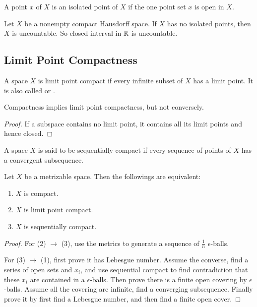 \begin{definition}
    A point $x$ of $X$ is an isolated point of $X$ if the one point set ${x}$ is open in $X$.
\end{definition}

\begin{theorem}
    Let $X$ be a nonempty compact Hausdorff space. If $X$ has no isolated points, then $X$ is uncountable.
    So closed interval in $\mathbb{R}$ is uncountable.
\end{theorem}




\subsection{Limit Point Compactness}

\begin{definition}
    A space $X$ is limit point compact if every infinite subset of $X$ has a limit point. It is also called  or .
\end{definition}

\begin{theorem}
    Compactness implies limit point compactness, but not conversely.    
\end{theorem}
\begin{proof}
    If a subspace contains no limit point, it contains all its limit points and hence closed.
\end{proof}

\begin{definition}
    A space $X$ is said to be sequentially compact if every sequence of points of $X$ has a convergent subsequence.
\end{definition}

\begin{theorem}
    Let $X$ be a metrizable space. Then the followings are equivalent:
    \begin{enumerate}
        \item $X$ is compact.
        \item $X$ is limit point compact.
        \item $X$ is sequentially compact.
    \end{enumerate}    
\end{theorem}
\begin{proof}
    For (2) $\rightarrow$ (3), use the metrics to generate a sequence of $\frac{1}{n}$ $\epsilon$-balls.
    
    For (3) $\rightarrow$ (1), first prove it has Lebesgue number. Assume the converse, find a series of open sets and $x_i$, and use sequential compact to find contradiction that these $x_i$ are contained in a $\epsilon$-balls. Then prove there is a finite open covering by $\epsilon$-balls. Assume all the covering are infinite, find a converging subsequence. Finally prove it by first find a Lebesgue number, and then find a finite open cover.
\end{proof}


